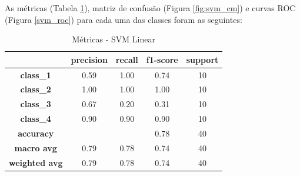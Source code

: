 \documentclass[
	article,			%
	11pt,				%
	oneside,			%
	a4paper,			%
	english,			%
	brazil,				%
	sumario=tradicional
	]{abntex2}
\begin{document}
As métricas (Tabela \ref{tab:svm_01}), matriz de confusão (Figura \ref{fig:svm_cm}) e curvas ROC (Figura \ref{svm_roc}) para cada uma das classes foram as seguintes:

\begin{table}[]
\centering
\begin{tabular}{c|c|c|c|c|}
\cline{2-5}
                                            & \textbf{precision} & \textbf{recall} & \textbf{f1-score} & \textbf{support} \\ \hline
\multicolumn{1}{|c|}{\textbf{class\_1}}     & 0.59               & 1.00            & 0.74              & 10               \\ \hline
\multicolumn{1}{|c|}{\textbf{class\_2}}     & 1.00               & 1.00            & 1.00              & 10               \\ \hline
\multicolumn{1}{|c|}{\textbf{class\_3}}     & 0.67               & 0.20            & 0.31              & 10               \\ \hline
\multicolumn{1}{|c|}{\textbf{class\_4}}     & 0.90               & 0.90            & 0.90              & 10               \\ \hline
\multicolumn{1}{|c|}{\textbf{accuracy}}     &                    &                 & 0.78              & 40               \\ \hline
\multicolumn{1}{|c|}{\textbf{macro avg}}    & 0.79               & 0.78            & 0.74              & 40               \\ \hline
\multicolumn{1}{|c|}{\textbf{weighted avg}} & 0.79               & 0.78            & 0.74              & 40               \\ \hline
\end{tabular}
\caption{Métricas - SVM Linear}
\label{tab:svm_01}
\end{table}
\end{document}
